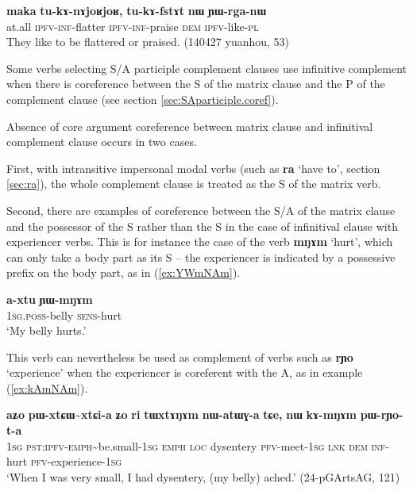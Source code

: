 \documentclass[oldfontcommands,oneside,a4paper,11pt]{article}
\newcommand{\ipa}[1]{\textbf{\phon#1}} %
\newcommand{\jpg}[2]{\ipa{#1} `#2'} %
\newcommand{\tld}{\textasciitilde{}}
\begin{document}
  \begin{exe}
   \ex   \label{ex:YWrganW} 
\gll
\ipa{maka}  	\ipa{tu-kɤ-nɤjoʁjoʁ,}  	\ipa{tu-kɤ-fstɤt}  	\ipa{nɯ}  	\ipa{ɲɯ-rga-nɯ}  \\
at.all \textsc{ipfv-inf}-flatter \textsc{ipfv-inf}-praise \textsc{dem} \textsc{ipfv}-like-\textsc{pl} \\
\glt They like to be flattered or praised. (140427 yuanhou, 53)
    \end{exe}  

Some verbs selecting S/A participle complement clauses use infinitive complement when there is coreference between the S of the matrix clause and the P of the complement clause (see section \ref{sec:SAparticiple.coref}).

Absence of core argument coreference between matrix clause and infinitival complement clause occurs in two cases. 

First, with intransitive impersonal modal verbs (such as \jpg{ra}{have to}, section \ref{sec:ra}), the whole complement clause is treated as the S of the matrix verb. 

Second, there are examples of coreference between the S/A of the matrix clause and the possessor of the S rather than the S in the case of infinitival clause with experiencer verbs. This is for instance the case of the verb \ipa{mŋɤm} `hurt', which can only take a body part as its S -- the experiencer is indicated by a possessive prefix on the body part, as in (\ref{ex:YWmNAm}).
 
 \begin{exe}
\ex \label{ex:YWmNAm}
\gll \ipa{a-xtu} 	\ipa{ɲɯ-mŋɤm} \\
\textsc{1sg.poss}-belly \textsc{sens}-hurt \\
\glt `My belly hurts.' 
\end{exe}
 
This verb can nevertheless be  used as complement of verbs such as \jpg{rɲo}{experience} when the experiencer is coreferent with the A, as in example (\ref{ex:kAmNAm}).
 
 \begin{exe}
\ex \label{ex:kAmNAm}
\gll \ipa{aʑo} 	\ipa{pɯ-xtɕɯ\tld{}xtɕi-a} 	\ipa{ʑo} 	\ipa{ri} 	\ipa{tɯxtɤŋɤm} 	\ipa{nɯ-atɯɣ-a} 	\ipa{tɕe,} 	\ipa{nɯ} 	\ipa{kɤ-mŋɤm} 	\ipa{pɯ-rɲo-t-a} \\
\textsc{1sg} \textsc{pst:ipfv-emph}\tld{}be.small-\textsc{1sg} \textsc{emph} \textsc{loc} dysentery \textsc{pfv}-meet-\textsc{1sg} \textsc{lnk} \textsc{dem} \textsc{inf}-hurt \textsc{pfv}-experience-\textsc{1sg} \\
\glt `When I was very small, I had dysentery, (my belly) ached.'  (24-pGArtsAG, 121)
\end{exe}
\end{document}
